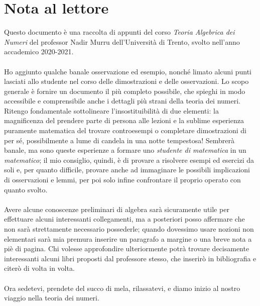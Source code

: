\documentclass[a4paper,twoside]{book}
\begin{document}
	\section*{Nota al lettore}
	Questo documento è una raccolta di appunti del corso \textit{Teoria Algebrica dei Numeri} del professor Nadir Murru dell'Università di Trento, svolto nell'anno accademico 2020-2021. \\ \\ 
	Ho aggiunto qualche banale osservazione ed esempio, nonché limato alcuni punti lasciati allo studente nel corso delle dimostrazioni e delle osservazioni. Lo scopo generale è fornire un documento il più completo possibile, che spieghi in modo accessibile e comprensibile anche i dettagli più strani della teoria dei numeri. \\ Ritengo fondamentale sottolineare l'insostituibilità di due elementi: la magnificenza del prendere parte di persona alle lezioni e la sublime esperienza puramente matematica del trovare controesempi o completare dimostrazioni di per sé, possibilmente a lume di candela in una notte tempestosa! Sembrerà banale, ma sono queste esperienze a formare uno \textit{studente di matematica} in un \textit{matematico}; il mio consiglio, quindi, è di provare a risolvere esempi ed esercizi da soli e, per quanto difficile, provare anche ad immaginare le possibili implicazioni di osservazioni e lemmi, per poi solo infine confrontare il proprio operato con quanto svolto. \\ \\ 
	Avere alcune conoscenze preliminari di algebra sarà sicuramente utile per effettuare alcuni interessanti collegamenti, ma a posteriori posso affermare che non sarà strettamente necessario possederle; quando dovessimo usare nozioni non elementari sarà mia premura inserire un paragrafo a margine o una breve nota a piè di pagina. Chi volesse approfondire ulteriormente potrà trovare decisamente interessanti alcuni libri proposti dal professore stesso, che inserirò in bibliografia e citerò di volta in volta.\\ \\ 
	Ora sedetevi, prendete del succo di mela, rilassatevi, e diamo inizio al nostro viaggio nella teoria dei numeri.
	
	
	
	\newpage
\end{document}
